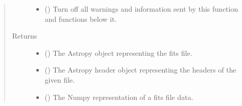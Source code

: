 \documentclass[letterpaper,10pt,english]{sphinxmanual}
\begin{document}
\begin{fulllineitems}
\begin{quote}
\begin{description}
\begin{itemize}
\item {} 
 (\sphinxstyleliteralemphasis{\sphinxupquote{ (}}\sphinxstyleliteralemphasis{\sphinxupquote{)}}) \textendash{} Turn off all warnings and information sent by this function and
functions below it.

\end{itemize}

\item[{Returns}] \leavevmode
\begin{itemize}
\item {} 
 () \textendash{} The Astropy object representing the fits file.

\item {} 
 () \textendash{} The Astropy header object representing the headers of the given file.

\item {} 
 () \textendash{} The Numpy representation of a fits file data.

\end{itemize}


\end{description}\end{quote}

\end{fulllineitems}

\end{document}
